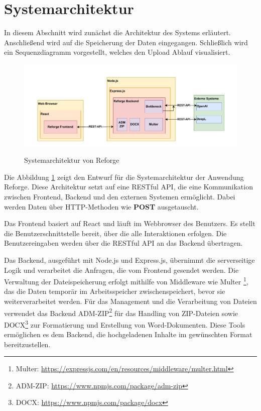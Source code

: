\section{Systemarchitektur}

In diesem Abschnitt wird zunächst die Architektur des Systems erläutert. Anschließend wird auf die Speicherung der Daten eingegangen. Schließlich wird ein Sequenzdiagramm vorgestellt, welches den Upload Ablauf visualisiert.

\begin{figure}[H]
\centering
\includegraphics[width=1\linewidth]{Images/Systemarchitektur.pdf}\\
\caption{Systemarchitektur von Reforge}
\label{fig:sys_architektur}
\end{figure}

Die Abbildung \ref{fig:sys_architektur} zeigt den Entwurf für die Systemarchitektur der Anwendung Reforge. Diese Architektur setzt auf eine RESTful \ac{API}, die eine Kommunikation zwischen Frontend, Backend und den externen Systemen ermöglicht. Dabei werden Daten über \ac{HTTP}-Methoden wie \textbf{POST} ausgetauscht.

Das Frontend basiert auf React und läuft im Webbrowser des Benutzers. Es stellt die Benutzerschnittstelle bereit, über die alle Interaktionen erfolgen. Die Benutzereingaben werden über die RESTful \ac{API} an das Backend übertragen. 

Das Backend, ausgeführt mit Node.js und Express.js, übernimmt die serverseitige Logik und verarbeitet die Anfragen, die vom Frontend gesendet werden. Die Verwaltung der Dateispeicherung erfolgt mithilfe von Middleware wie Multer \footnote[1]{Multer: \href{https://expressjs.com/en/resources/middleware/multer.html}{https://expressjs.com/en/resources/middleware/multer.html}}, das die Daten temporär im Arbeitsspeicher zwischenspeichert, bevor sie weiterverarbeitet werden. Für das Management und die Verarbeitung von Dateien verwendet das Backend ADM-ZIP\footnote[2]{ADM-ZIP: \href{https://www.npmjs.com/package/adm-zip}{https://www.npmjs.com/package/adm-zip}} für das Handling von ZIP-Dateien sowie DOCX\footnote[3]{DOCX: \href{https://www.npmjs.com/package/docx}{https://www.npmjs.com/package/docx}} zur Formatierung und Erstellung von Word-Dokumenten. Diese Tools ermöglichen es dem Backend, die hochgeladenen Inhalte im gewünschten Format bereitzustellen.

